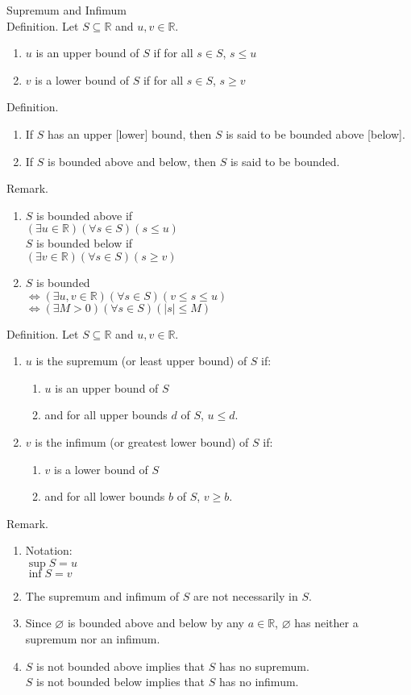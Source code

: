 \documentclass{article}
\newcommand{\reals}{\mathbb{R}}
\let\emptyset\varnothing
\begin{document}
Supremum and Infimum \\
Definition. Let $S \subseteq \reals$ and $u, v \in \reals$.
\begin{enumerate}
	\item
		$u$ is an upper bound of $S$ if for all $s \in S$, $s \leq u$
	\item
		$v$ is a lower bound of $S$ if for all $s \in S$, $s \geq v$
\end{enumerate}
Definition.
\begin{enumerate}
	\item
		If $S$ has an upper [lower] bound, then $S$ is said to be bounded above [below].
	\item
		If $S$ is bounded above and below, then $S$ is said to be bounded.
\end{enumerate}
Remark.
\begin{enumerate}
	\item
		$S$ is bounded above if \\
		$(\exists u \in \reals)(\forall s \in S)(s \leq u)$ \\
		$S$ is bounded below if \\
		$(\exists v \in \reals)(\forall s \in S)(s \geq v)$
	\item
		$S$ is bounded \\
		$\Leftrightarrow (\exists u, v \in \reals)(\forall s \in S)(v \leq s \leq u)$ \\
		$\Leftrightarrow (\exists M > 0)(\forall s \in S)(|s| \leq M)$
\end{enumerate}
Definition. Let $S \subseteq \reals$ and $u, v \in \reals$.
\begin{enumerate}
	\item
		$u$ is the supremum (or least upper bound) of $S$ if:
		\begin{enumerate}
			\item
				$u$ is an upper bound of $S$
			\item
				and for all upper bounds $d$ of $S$, $u \leq d$.
		\end{enumerate}
	\item
		$v$ is the infimum (or greatest lower bound) of $S$ if:
		\begin{enumerate}
			\item
				$v$ is a lower bound of $S$
			\item
				and for all lower bounds $b$ of $S$, $v \geq b$.
		\end{enumerate}
\end{enumerate}
Remark.
\begin{enumerate}
	\item
		Notation: \\
		$\sup S = u$ \\
		$\inf S = v$
	\item
		The supremum and infimum of $S$ are not necessarily in $S$.
	\item
		Since $\emptyset$ is bounded above and below by any $a \in \reals$, $\emptyset$ has neither a supremum nor an infimum.
	\item
		$S$ is not bounded above implies that $S$ has no supremum. \\
		$S$ is not bounded below implies that $S$ has no infimum.
\end{enumerate}
\end{document}
